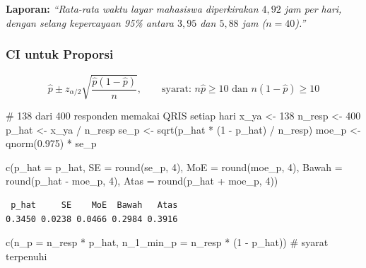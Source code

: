 \documentclass[
  indonesian,
  letterpaper,
]{book}
\newenvironment{Shaded}{\begin{snugshade}}{\end{snugshade}}
\newcommand{\AttributeTok}[1]{\textcolor[rgb]{0.40,0.45,0.13}{#1}}
\newcommand{\CommentTok}[1]{\textcolor[rgb]{0.37,0.37,0.37}{#1}}
\newcommand{\DecValTok}[1]{\textcolor[rgb]{0.68,0.00,0.00}{#1}}
\newcommand{\FloatTok}[1]{\textcolor[rgb]{0.68,0.00,0.00}{#1}}
\newcommand{\FunctionTok}[1]{\textcolor[rgb]{0.28,0.35,0.67}{#1}}
\newcommand{\NormalTok}[1]{\textcolor[rgb]{0.00,0.23,0.31}{#1}}
\newcommand{\OtherTok}[1]{\textcolor[rgb]{0.00,0.23,0.31}{#1}}
\newcommand{\SpecialCharTok}[1]{\textcolor[rgb]{0.37,0.37,0.37}{#1}}
\begin{document}
\textbf{Laporan:} \emph{``Rata-rata waktu layar mahasiswa diperkirakan
\(4{,}92\) jam per hari, dengan selang kepercayaan 95\% antara
\(3{,}95\) dan \(5{,}88\) jam (\(n = 40\)).''}

\subsubsection{CI untuk Proporsi}\label{ci-untuk-proporsi}

\[\hat{p} \pm z_{\alpha/2} \sqrt{\frac{\hat{p}(1 - \hat{p})}{n}}, \qquad \text{syarat: } n\hat{p} \ge 10 \text{ dan } n(1 - \hat{p}) \ge 10\]

\begin{Shaded}
\begin{Highlighting}[]
\CommentTok{\# 138 dari 400 responden memakai QRIS setiap hari}
\NormalTok{x\_ya }\OtherTok{\textless{}{-}} \DecValTok{138}
\NormalTok{n\_resp }\OtherTok{\textless{}{-}} \DecValTok{400}
\NormalTok{p\_hat }\OtherTok{\textless{}{-}}\NormalTok{ x\_ya }\SpecialCharTok{/}\NormalTok{ n\_resp}
\NormalTok{se\_p }\OtherTok{\textless{}{-}} \FunctionTok{sqrt}\NormalTok{(p\_hat }\SpecialCharTok{*}\NormalTok{ (}\DecValTok{1} \SpecialCharTok{{-}}\NormalTok{ p\_hat) }\SpecialCharTok{/}\NormalTok{ n\_resp)}
\NormalTok{moe\_p }\OtherTok{\textless{}{-}} \FunctionTok{qnorm}\NormalTok{(}\FloatTok{0.975}\NormalTok{) }\SpecialCharTok{*}\NormalTok{ se\_p}

\FunctionTok{c}\NormalTok{(}\AttributeTok{p\_hat =}\NormalTok{ p\_hat,}
  \AttributeTok{SE =} \FunctionTok{round}\NormalTok{(se\_p, }\DecValTok{4}\NormalTok{),}
  \AttributeTok{MoE =} \FunctionTok{round}\NormalTok{(moe\_p, }\DecValTok{4}\NormalTok{),}
  \AttributeTok{Bawah =} \FunctionTok{round}\NormalTok{(p\_hat }\SpecialCharTok{{-}}\NormalTok{ moe\_p, }\DecValTok{4}\NormalTok{),}
  \AttributeTok{Atas =} \FunctionTok{round}\NormalTok{(p\_hat }\SpecialCharTok{+}\NormalTok{ moe\_p, }\DecValTok{4}\NormalTok{))}
\end{Highlighting}
\end{Shaded}

\begin{verbatim}
 p_hat     SE    MoE  Bawah   Atas 
0.3450 0.0238 0.0466 0.2984 0.3916 
\end{verbatim}

\begin{Shaded}
\begin{Highlighting}[]
\FunctionTok{c}\NormalTok{(}\AttributeTok{n\_p =}\NormalTok{ n\_resp }\SpecialCharTok{*}\NormalTok{ p\_hat, }\AttributeTok{n\_1\_min\_p =}\NormalTok{ n\_resp }\SpecialCharTok{*}\NormalTok{ (}\DecValTok{1} \SpecialCharTok{{-}}\NormalTok{ p\_hat)) }\CommentTok{\# syarat terpenuhi}
\end{Highlighting}
\end{Shaded}
\end{document}
